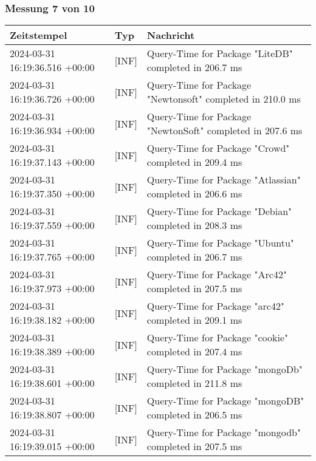     \subsubsection*{Messung 7 von 10} \label{subsubsec:MySQLOhneIndex7von10}
        {
            {\small
                \begin{tabularx}{\textwidth}{|l|l|X|}
                    \hline
                    \textbf{Zeitstempel} & \textbf{Typ} & \textbf{Nachricht} \\
                    \hline
                    \endhead
                    2024-03-31 16:19:36.516 +00:00 & [INF] & Query-Time for Package "LiteDB" completed in 206.7 ms \\
                    2024-03-31 16:19:36.726 +00:00 & [INF] & Query-Time for Package "Newtonsoft" completed in 210.0 ms \\
                    2024-03-31 16:19:36.934 +00:00 & [INF] & Query-Time for Package "NewtonSoft" completed in 207.6 ms \\
                    2024-03-31 16:19:37.143 +00:00 & [INF] & Query-Time for Package "Crowd" completed in 209.4 ms \\
                    2024-03-31 16:19:37.350 +00:00 & [INF] & Query-Time for Package "Atlassian" completed in 206.6 ms \\
                    2024-03-31 16:19:37.559 +00:00 & [INF] & Query-Time for Package "Debian" completed in 208.3 ms \\
                    2024-03-31 16:19:37.765 +00:00 & [INF] & Query-Time for Package "Ubuntu" completed in 206.7 ms \\
                    2024-03-31 16:19:37.973 +00:00 & [INF] & Query-Time for Package "Arc42" completed in 207.5 ms \\
                    2024-03-31 16:19:38.182 +00:00 & [INF] & Query-Time for Package "arc42" completed in 209.1 ms \\
                    2024-03-31 16:19:38.389 +00:00 & [INF] & Query-Time for Package "cookie" completed in 207.4 ms \\
                    2024-03-31 16:19:38.601 +00:00 & [INF] & Query-Time for Package "mongoDb" completed in 211.8 ms \\
                    2024-03-31 16:19:38.807 +00:00 & [INF] & Query-Time for Package "mongoDB" completed in 206.5 ms \\
                    2024-03-31 16:19:39.015 +00:00 & [INF] & Query-Time for Package "mongodb" completed in 207.5 ms \\

\end{tabularx}}}
